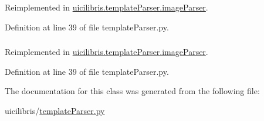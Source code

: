 \-Reimplemented in \hyperlink{classuicilibris_1_1templateParser_1_1imageParser_acbade4bd60a213ae591dad90f64021a7}{uicilibris.\-template\-Parser.\-image\-Parser}.



\-Definition at line 39 of file template\-Parser.\-py.

\hypertarget{classuicilibris_1_1templateParser_1_1templateParser_ac3d4f484ad1e51f0191b43c21f4a6873}{
\subsubsection[{regexp}]{}}\label{classuicilibris_1_1templateParser_1_1templateParser_ac3d4f484ad1e51f0191b43c21f4a6873}


\-Reimplemented in \hyperlink{classuicilibris_1_1templateParser_1_1imageParser_aaf8ed396434c4dc4b6edc3dcf1ffbbd2}{uicilibris.\-template\-Parser.\-image\-Parser}.



\-Definition at line 39 of file template\-Parser.\-py.



\-The documentation for this class was generated from the following file\-:\begin{DoxyCompactItemize}
\item 
uicilibris/\hyperlink{templateParser_8py}{template\-Parser.\-py}\end{DoxyCompactItemize}
